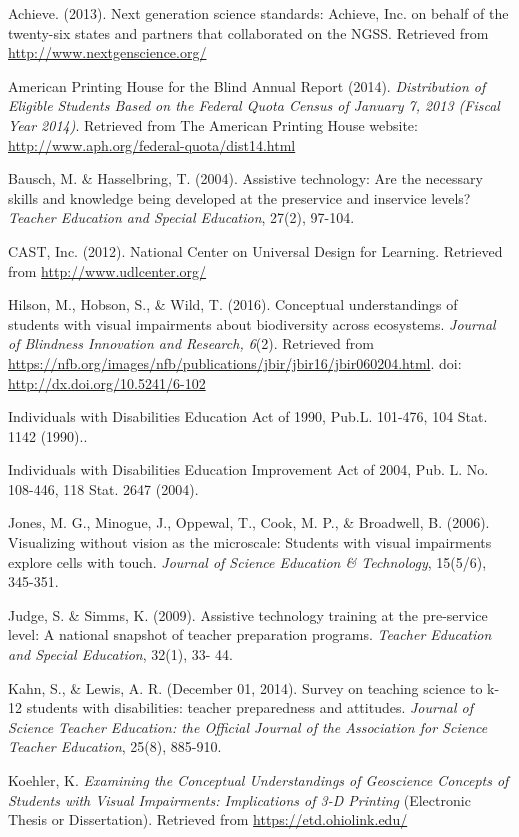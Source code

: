 \documentclass[11.5pt]{sig-alternate} %
\begin{document}
\leftskip 0.25in
\parindent -0.25in 

Achieve. (2013). Next generation science standards: Achieve, Inc. on behalf of the twenty-six states and partners that collaborated on the NGSS. Retrieved from \url{http://www.nextgenscience.org/}

American Printing House for the Blind Annual Report (2014). \textit{Distribution of Eligible Students Based on the Federal Quota Census of January 7, 2013 (Fiscal Year 2014)}. Retrieved from The American Printing House website: \url{http://www.aph.org/federal-quota/dist14.html}

Bausch, M. \& Hasselbring, T.  (2004).  Assistive technology: Are the necessary skills and knowledge being developed at the preservice and inservice levels? \textit{Teacher Education and Special Education}, 27(2), 97-104.

CAST, Inc. (2012). National Center on Universal Design for Learning. Retrieved from \url{http://www.udlcenter.org/}

Hilson, M., Hobson, S., \& Wild, T. (2016). Conceptual understandings of students with visual impairments about biodiversity across ecosystems. \textit{Journal of Blindness Innovation and Research, 6}(2). Retrieved from \url{https://nfb.org/images/nfb/publications/jbir/jbir16/jbir060204.html}. doi: \url{http://dx.doi.org/10.5241/6-102}

Individuals with Disabilities Education Act of 1990, Pub.L. 101-476, 104 Stat. 1142 (1990)..

Individuals with Disabilities Education Improvement Act of 2004, Pub. L. No. 108-446, 118 Stat. 2647 (2004).

Jones, M. G., Minogue, J., Oppewal, T., Cook, M. P., \& Broadwell, B.  (2006). Visualizing without vision as the microscale: Students with visual impairments explore cells with touch.  \textit{Journal of Science Education \& Technology}, 15(5/6), 345-351.

Judge, S. \& Simms, K.  (2009).  Assistive technology training at the pre-service level: A national snapshot of teacher preparation programs.  \textit{Teacher Education and Special Education}, 32(1), 33- 44.

Kahn, S., \& Lewis, A. R. (December 01, 2014). Survey on teaching science to k-12 students with disabilities: teacher preparedness and attitudes. \textit{Journal of Science Teacher Education: the Official Journal of the Association for Science Teacher Education}, 25(8), 885-910.

Koehler, K.  \textit{Examining the Conceptual Understandings of Geoscience Concepts of Students with Visual Impairments:  Implications of 3-D Printing} (Electronic Thesis or Dissertation). Retrieved from \url{https://etd.ohiolink.edu/}
\end{document}
